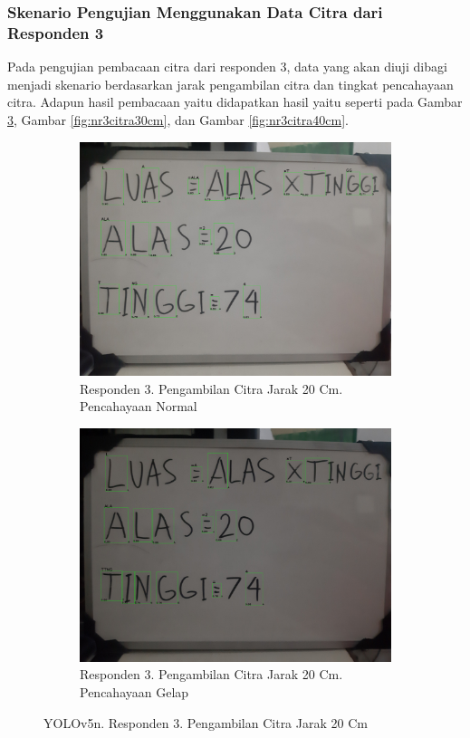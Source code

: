 \subsubsection{Skenario Pengujian Menggunakan Data Citra dari Responden 3}
\label{subsubsec:nskenarioresponden3}

Pada pengujian pembacaan citra dari responden 3, data yang akan diuji dibagi menjadi skenario berdasarkan jarak pengambilan citra dan tingkat pencahayaan citra. Adapun hasil pembacaan yaitu didapatkan hasil yaitu seperti pada Gambar \ref*{fig:nr3citra20cm}, Gambar \ref*{fig:nr3citra30cm}, dan Gambar \ref*{fig:nr3citra40cm}.

\begin{figure}[H]
  \begin{subfigure}{.5\textwidth}
    \centering
    \captionsetup{width=.8\linewidth}
    \includegraphics[width=.8\linewidth]{gambar/yolov5n/responden3/hans20cm00-result.jpg}
    \caption{Responden 3. Pengambilan Citra Jarak 20 Cm. Pencahayaan Normal}
    \label{fig:nr3tcitra20cm}
  \end{subfigure}%
  \begin{subfigure}{.5\textwidth}
    \centering
    \captionsetup{width=.8\linewidth}
    \includegraphics[width=.8\linewidth]{gambar/yolov5n/responden3/hans20cm10-result.jpg}
    \caption{Responden 3. Pengambilan Citra Jarak 20 Cm. Pencahayaan Gelap}
    \label{fig:nr3gcitra20cm}
  \end{subfigure}
  \caption{YOLOv5n. Responden 3. Pengambilan Citra Jarak 20 Cm}
  \label{fig:nr3citra20cm}
\end{figure}

